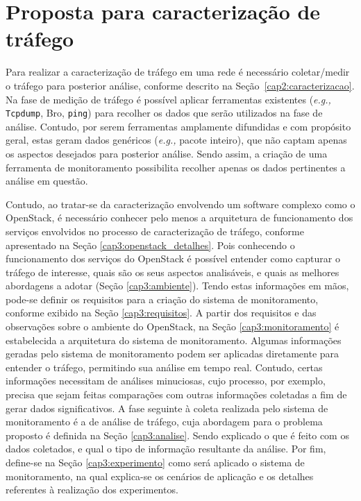 \chapter{Proposta para caracterização de tráfego}
\label{cap3}

Para realizar a caracterização de tráfego em uma rede é necessário coletar/medir o tráfego para posterior análise, conforme descrito na Seção~\ref{cap2:caracterizacao}.
%
Na fase de medição de tráfego é possível aplicar ferramentas existentes (\textit{e.g., } \texttt{Tcpdump}, Bro, \texttt{ping}) para recolher os dados que serão utilizados na fase de análise.
%
Contudo, por serem ferramentas amplamente difundidas e com propósito geral, estas geram dados genéricos (\textit{e.g.,} pacote inteiro), que não captam apenas os aspectos desejados para posterior análise.
%
Sendo assim, a criação de uma ferramenta de monitoramento possibilita recolher apenas os dados pertinentes a análise em questão.

Contudo, ao tratar-se da caracterização envolvendo um software complexo como o OpenStack, é necessário conhecer pelo menos a arquitetura de funcionamento dos serviços envolvidos no processo de caracterização de tráfego, conforme apresentado na Seção \ref{cap3:openstack_detalhes}.
%
Pois conhecendo o funcionamento dos serviços do OpenStack é possível entender como capturar o tráfego de interesse, quais são os seus aspectos analisáveis, e quais as melhores abordagens a adotar (Seção \ref{cap3:ambiente}).
%
Tendo estas informações em mãos, pode-se definir os requisitos para a criação do sistema de monitoramento, conforme exibido na Seção \ref{cap3:requisitos}.
%
A partir dos requisitos e das observações sobre o ambiente do OpenStack, na Seção \ref{cap3:monitoramento} é estabelecida a arquitetura do sistema de monitoramento.
%
Algumas informações geradas pelo sistema de monitoramento podem ser aplicadas diretamente para entender o tráfego, permitindo sua análise em tempo real. 
%
Contudo, certas informações necessitam de análises minuciosas, cujo processo, por exemplo, precisa que sejam feitas comparações com outras informações coletadas a fim de gerar dados significativos.
%
A fase seguinte à coleta realizada pelo sistema de monitoramento é a de análise de tráfego, cuja abordagem para o problema proposto é definida na Seção \ref{cap3:analise}.
%
Sendo explicado o que é feito com os dados coletados, e qual o tipo de informação resultante da análise.
%
Por fim, define-se na Seção \ref{cap3:experimento} como será aplicado o sistema de monitoramento, na qual explica-se os cenários de aplicação e os detalhes referentes à realização dos experimentos.

